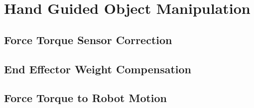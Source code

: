 \chapter{Hand Guided Object Manipulation}

\section{Force Torque Sensor Correction }

\section{End Effector Weight Compensation}

\section{Force Torque to Robot Motion}